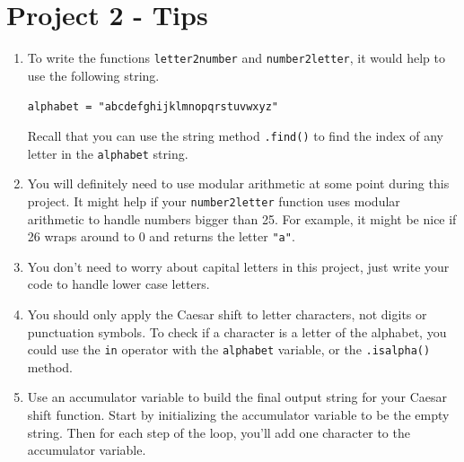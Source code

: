 \documentclass[12pt]{article}
\begin{document}
\section*{Project 2 - Tips}

\begin{enumerate}
\item To write the functions \verb|letter2number| and \verb|number2letter|, it would help to use the following string. 
\begin{center}
\verb|alphabet = "abcdefghijklmnopqrstuvwxyz"|
\end{center}
Recall that you can use the string method \verb|.find()| to find the index of any letter in the \verb|alphabet| string. 

\item You will definitely need to use modular arithmetic at some point during this project. It might help if your \verb|number2letter| function uses modular arithmetic to handle numbers bigger than 25.  For example, it might be nice if 26 wraps around to 0 and returns the letter \verb|"a"|.  

\item You don't need to worry about capital letters in this project, just write your code to handle lower case letters. 

\item You should only apply the Caesar shift to letter characters, not digits or punctuation symbols.  To check if a character is a letter of the alphabet, you could use the \verb|in| operator with the \verb|alphabet| variable, or the \verb|.isalpha()| method.  

\item Use an accumulator variable to build the final output string for your Caesar shift function. Start by initializing the accumulator variable to be the empty string.  Then for each step of the loop, you'll add one character to the accumulator variable.  




\end{enumerate}
\end{document}
